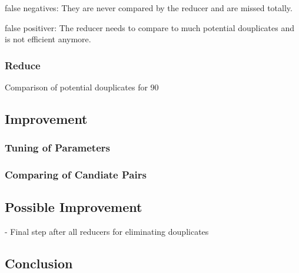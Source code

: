 \documentclass[a4paper, 11pt]{article}
\begin{document}
false negatives: They are never compared by the reducer and are missed totally.

false positiver: The reducer needs to compare to much potential douplicates and is not
efficient anymore.




\subsubsection{Reduce}

Comparison of potential douplicates for 90%


\subsection{Improvement}

\subsubsection{Tuning of Parameters}

\subsubsection{Comparing of Candiate Pairs}

\subsection{Possible Improvement}

- Final step after all reducers for eliminating douplicates

\subsection{Conclusion}
\end{document}
